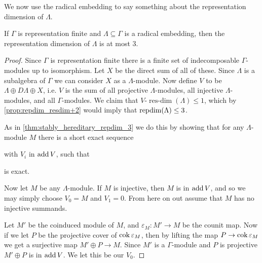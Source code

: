 We now use the radical embedding to say something about the representation dimension of $\Lambda$.

\begin{theorem}\cite[Theorem~1.1]{EHIS04}\label{thm:radical_embedding_repdim_3}
	If $\Gamma$ is representation finite and $\Lambda \subseteq \Gamma$ is a radical embedding, then the representation dimension of $\Lambda$ is at most 3.
	\begin{proof}
		Since $\Gamma$ is representation finite there is a finite set of indecomposable $\Gamma$-modules up to isomorphism. Let $X$ be the direct sum of all of these. Since $\Lambda$ is a subalgebra of $\Gamma$ we can consider $X$ as a $\Lambda$-module. Now define $V$ to be $\Lambda \oplus D\Lambda \oplus X$, i.e. $V$ is the sum of all projective $\Lambda$-modules, all injective $\Lambda$-modules, and all $\Gamma$-modules. We claim that $V$-$\operatorname{res-dim}(\Lambda) \leq 1$, which by \cref{prop:repdim_resdim+2} would imply that $\operatorname{repdim}(\Lambda) \leq 3$.
		
		As in \cref{thm:stably_hereditary_repdim_3} we do this by showing that for any  $\Lambda$-module $M$ there is a short exact sequence
		\begin{center}
		\end{center}
		with $V_i$ in $\operatorname{add} V$, such that 
		\begin{center}
		\end{center}
		is exact. 
		
		Now let $M$ be any $\Lambda$-module. If $M$ is injective, then $M$ is in $\operatorname{add} V$, and so we may simply choose $V_0 = M$ and $V_1=0$. From here on out assume that $M$ has no injective summands. 
		
		Let $M'$ be the coinduced module of $M$, and $\varepsilon_M\colon M' \to M$ be the counit map. Now if we let $P$ be the projective cover of $\operatorname{cok} \varepsilon_M$, then by lifting the map $P \to \operatorname{cok}\varepsilon_M$ we get a surjective map $M' \oplus P \to M$. Since $M'$ is a $\Gamma$-module and $P$ is projective $M'\oplus P$ is in $\operatorname{add} V$. We let this be our $V_0$.
		

\end{proof}
\end{theorem}
